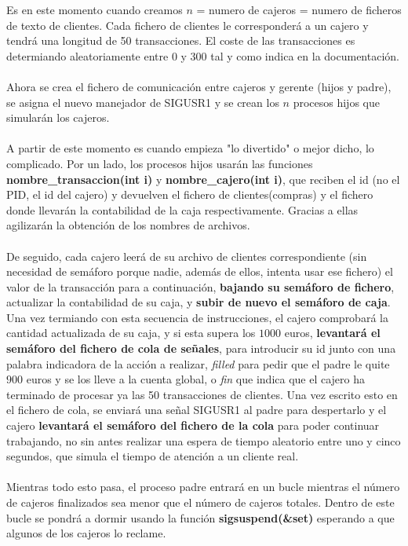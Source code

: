 \documentclass[12pt]{article}
\begin{document}
Es en este momento cuando creamos $n$ = numero de cajeros = numero de ficheros de texto de clientes. Cada fichero de clientes le corresponderá a un cajero y tendrá una longitud de 50 transacciones. El coste de las transacciones es determiando aleatoriamente entre 0 y 300 tal y como indica en la documentación.\\\\
Ahora se crea el fichero de comunicación entre cajeros y gerente (hijos y padre), se asigna el nuevo manejador de SIGUSR1 y se crean los $n$ procesos hijos que simularán los cajeros.\\\\
A partir de este momento es cuando empieza "lo divertido" o mejor dicho, lo complicado. Por un lado, los procesos hijos usarán las funciones \textbf{nombre\_transaccion(int i)} y \textbf{nombre\_cajero(int i)}, que reciben el id (no el PID, el id del cajero) y devuelven el fichero de clientes(compras) y el fichero donde llevarán la contabilidad de la caja respectivamente. Gracias a ellas agilizarán la obtención de los nombres de archivos.\\\\
De seguido, cada cajero leerá de su archivo de clientes correspondiente (sin necesidad de semáforo porque nadie, además de ellos, intenta usar ese fichero) el valor de la transacción para a continuación, \textbf{bajando su semáforo de fichero}, actualizar la contabilidad de su caja, y \textbf{subir de nuevo el semáforo de caja}. Una vez termiando con esta secuencia de instrucciones, el cajero comprobará la cantidad actualizada de su caja, y si esta supera los $1000$ euros, \textbf{levantará el semáforo del fichero de cola de señales}, para introducir su id junto con una palabra indicadora de la acción a realizar, \emph{filled} para pedir que el padre le quite $900$ euros y se los lleve a la cuenta global, o \emph{fin} que indica que el cajero ha terminado de procesar ya las 50 transacciones de clientes. Una vez escrito esto en el fichero de cola, se enviará una señal SIGUSR1 al padre para despertarlo y el cajero \textbf{levantará el semáforo del fichero de la cola} para poder continuar trabajando, no sin antes realizar una espera de tiempo aleatorio entre uno y cinco segundos, que simula el tiempo de atención a un cliente real.\\\\
Mientras todo esto pasa, el proceso padre entrará en un bucle mientras el número de cajeros finalizados sea menor que el número de cajeros totales. Dentro de este bucle se pondrá a dormir usando la función \textbf{sigsuspend(\&set)} esperando a que algunos de los cajeros lo reclame.\\\\
\end{document}
